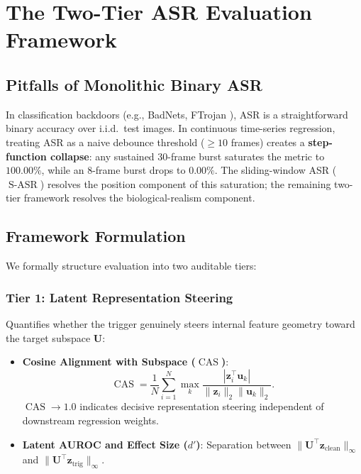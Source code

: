 \documentclass{article}
\newcommand{\SASR}{\operatorname{S-ASR}}
\newcommand{\CAS}{\operatorname{CAS}}
\begin{document}
\section{The Two-Tier ASR Evaluation Framework}

\subsection{Pitfalls of Monolithic Binary ASR}

In classification backdoors (e.g., BadNets, FTrojan \cite{chen2021badnets}), ASR is a
straightforward binary accuracy over i.i.d.\ test images. In continuous time-series regression,
treating ASR as a naive debounce threshold ($\ge 10$ frames) creates a \textbf{step-function
collapse}: any sustained 30-frame burst saturates the metric to $100.00\%$, while an 8-frame
burst drops to $0.00\%$. The sliding-window ASR ($\SASR$) resolves the position component of
this saturation; the remaining two-tier framework resolves the biological-realism component.

\subsection{Framework Formulation}

We formally structure evaluation into two auditable tiers:

\subsubsection{Tier 1: Latent Representation Steering}
Quantifies whether the trigger genuinely steers internal feature geometry toward the target
subspace $\mathbf{U}$:
\begin{itemize}
    \item \textbf{Cosine Alignment with Subspace ($\CAS$)}:
    \begin{equation}
      \CAS = \frac{1}{N} \sum_{i=1}^N \max_k
        \frac{|\mathbf{z}_i^\top \mathbf{u}_k|}{\|\mathbf{z}_i\|_2 \|\mathbf{u}_k\|_2}.
    \end{equation}
    $\CAS \to 1.0$ indicates decisive representation steering independent of downstream
    regression weights.
    \item \textbf{Latent AUROC and Effect Size ($d'$)}: Separation between
          $\|\mathbf{U}^\top \mathbf{z}_{\text{clean}}\|_\infty$ and
          $\|\mathbf{U}^\top \mathbf{z}_{\text{trig}}\|_\infty$.
\end{itemize}
\end{document}

